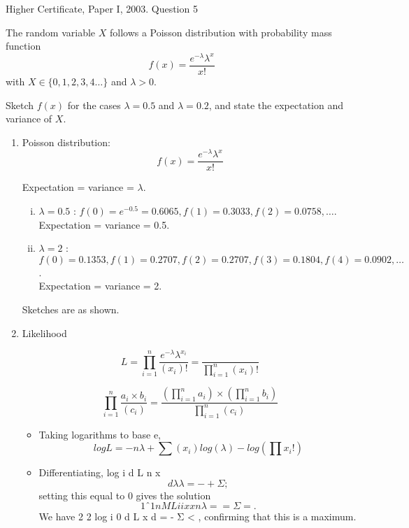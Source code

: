 \documentclass[a4paper,12pt]{article}
\begin{document}
Higher Certificate, Paper I, 2003. Question 5
\begin{framed}
The random variable $X$ follows a Poisson distribution with probability mass function
\[f(x) = \frac{e^{-\lambda} \lambda^{x}}{x!}\]
with $X \in \{0,1,2,3,4\ldots\}$ and $\lambda >0$.


Sketch $f(x)$ for the cases $\lambda = 0.5$ and $\lambda = 0.2$, and state the expectation and
variance of $X$.
\end{framed}


\begin{enumerate}
\item Poisson distribution: 
  \[f(x) = \frac{e^{-\lambda} \lambda^{x}}{x!}\]

Expectation = variance = $\lambda$.

\begin{enumerate}[(i)]
    \item 
$\lambda = 0.5$ : $f (0) = e^{-0.5} = 0.6065, f (1) = 0.3033, f (2) = 0.0758, … $.\\
Expectation = variance = 0.5.
\item $\lambda = 2$ : $f (0) = 0.1353, f (1) = 0.2707, f (2) = 0.2707, f (3) = 0.1804,
f (4) = 0.0902, \ldots $. \\

Expectation = variance = 2.
\end{enumerate}

Sketches are as shown.
\item Likelihood 

\[ L = \prod^n_{i=1} \frac{e^{-\lambda} \lambda^{x_i}}{(x_i)!} = \frac{}{\prod^n_{i=1}(x_i)!} \]

\begin{framed}
\[\prod^n_{i=1} \frac{a_i \times b_i }{(c_i)}  = \frac{(\prod^n_{i=1}a_i) \times (\prod^n_{i=1}b_i) }{\prod^n_{i=1}(c_i)}\]
\end{framed}

\begin{itemize}
\item Taking logarithms to base e,
\[log L = - n\lambda + \sum (x_i) log (\lambda ) - log( \prod x_i !)  \]   

\item Differentiating, log i d L n x
\[d\lambda \lambda
= - + Σ ; \] setting this equal to 0 gives the solution
\[1
ˆ 1 n
ML i
i
x x
n
\lambda
=
  = Σ = . \]We have
2
2
log i 0 d L x
d\lambda {}
= - Σ < , confirming that this is
a maximum.


\end{itemize}
\end{enumerate}
\end{document}
